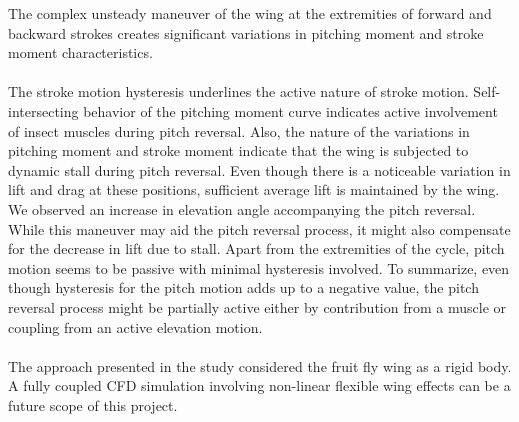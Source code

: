 The complex unsteady maneuver of the wing at the extremities of forward and backward strokes creates significant variations in pitching moment and stroke moment characteristics.
\\
\\
The stroke motion hysteresis underlines the active nature of stroke motion. Self-intersecting behavior of the pitching moment curve indicates active involvement of insect muscles during pitch reversal. Also, the nature of the variations in pitching moment and stroke moment indicate that the wing is subjected to dynamic stall during pitch reversal. Even though there is a noticeable variation in lift and drag at these positions, sufficient average lift is maintained by the wing. We observed an increase in elevation angle accompanying the pitch reversal. While this maneuver may aid the pitch reversal process, it might also compensate for the decrease in lift due to stall. Apart from the extremities of the cycle, pitch motion seems to be passive with minimal hysteresis involved. To summarize, even though hysteresis for the pitch motion adds up to a negative value, the pitch reversal process might be partially active either by contribution from a muscle or coupling from an active elevation motion. 
\\
\\
The approach presented in the study considered the fruit fly wing as a rigid body. A fully coupled CFD simulation involving non-linear flexible wing effects can be a future scope of this project. 

